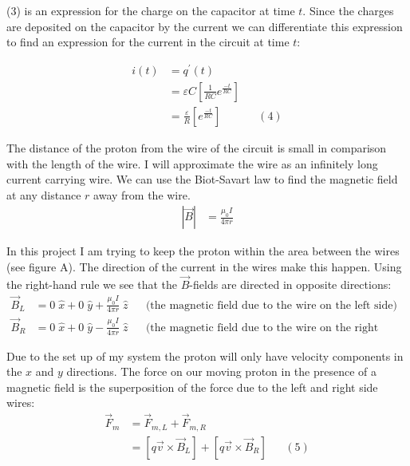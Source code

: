\documentclass[11pt]{article}
\begin{document}
\vspace{.2in}
\noindent (3) is an expression for the charge on the capacitor at time $t$. Since the charges are deposited on the capacitor by the current we can differentiate this expression to find an expression for the current in the circuit at time $t$: 

\begin{align*}
i(t)&=q^{'}(t)\\&=\varepsilon C\left[\frac{1}{RC}e^{\frac{-t}{RC}}\right]\\&=\frac{\varepsilon}{R}\left[e^{\frac{-t}{RC}}\right]&&(4)
\end{align*}

\vspace{.2in}

\noindent The distance of the proton from the wire of the circuit is small in comparison with the length of the wire. I will approximate the wire as an infinitely long current carrying wire. We can use the Biot-Savart law to find the magnetic field at any distance $r$ away from the wire. 
\begin{align*}
\left|\vec{B}\right|&=\frac{\mu_0I}{4\pi r}
\end{align*}

\vspace{.2in}

\noindent In this project I am trying to keep the proton within the area between the wires (see figure A). The direction of the current in the wires make this happen. Using the right-hand rule we see that the $\vec{B}$-fields are directed in opposite directions:
\begin{align*}
\vec{B}_L&=0\;\hat{x}+0\;\hat{y}+\frac{\mu_0I}{4\pi r}\;\hat{z}&&\text{(the magnetic field due to the wire on the left side)}\\\vec{B}_R&=0\;\hat{x}+0\;\hat{y}-\frac{\mu_0I}{4\pi r}\;\hat{z}&&\text{(the magnetic field due to the wire on the right side)}
\end{align*}

\vspace{.2in}

\noindent Due to the set up of my system the proton will only have velocity components in the $x$ and $y$ directions. The force on our moving proton in the presence of a magnetic field is the superposition of the force due to the left and right side wires:
\begin{align*}
\vec{F}_m&=\vec{F}_{m,L}+\vec{F}_{m,R}\\&=\left[q\vec{v}\times\vec{B}_L\right]+\left[q\vec{v}\times\vec{B}_R\right]&&(5)
\end{align*}
\end{document}
